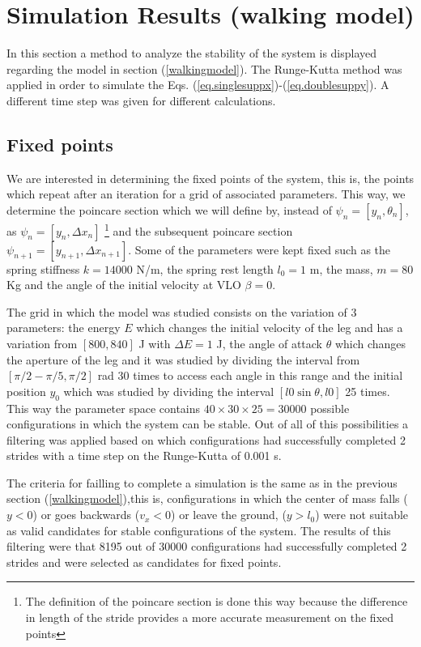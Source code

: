 \section{Simulation Results (walking model)}\label{simulation}
In this section a method to analyze the stability of the system is displayed regarding the model in section (\ref{walkingmodel}). The Runge-Kutta method \cite{runge} was applied in order to simulate the Eqs. (\ref{eq.singlesuppx})-(\ref{eq.doublesuppy}). A different time step was given for different calculations.
\subsection{Fixed points}\label{pontosfixos}
We are interested in determining the fixed points of the system, this is, the points which repeat after an iteration for a grid of associated parameters. This way, we determine the poincare section which we will define by, instead of $\psi_n=[y_n,\theta_n]$, as  $\psi_n=[y_n,\Delta x_n]$ \footnote{The definition of the poincare section is done this way because the difference in length of the stride provides a more accurate measurement on  the fixed points} and the subsequent poincare section $\psi_{n+1}=[y_{n+1},\Delta x_{n+1}]$. Some of the parameters were kept fixed such as the spring stiffness $k=14000$ N/m, the spring rest length $l_0=1$ m, the mass, $m=80$ Kg and the angle of the initial velocity at VLO $\beta=0$.

The grid in which the model was studied consists on the variation of 3 parameters: the energy $E$  which changes the initial velocity of the leg and has a variation from $[800,840]$ J with $\Delta E = 1$ J, the angle of attack $\theta$ which changes the aperture of the leg and it was studied by dividing the interval from $[\pi/2-\pi/5,\pi/2]$ rad 30 times to access each angle in this range and the initial position $y_0$ which was studied by dividing the interval $[l0 \sin{\theta}, l0]$ 25 times. This way the parameter space contains $40 \times 30 \times 25 = 30000$ possible configurations in which the system can be stable. Out of all of this possibilities a filtering was applied based on which configurations had successfully completed 2 strides with a time step on the Runge-Kutta of 0.001 s.

The criteria for failling to complete a simulation is the same as in the previous section (\ref{walkingmodel}),this is, configurations in which the center of mass falls ($y<0$) or goes backwards ($v_x<0$) or leave the ground, ($y>l_0$) were not suitable as valid candidates for stable configurations of the system. The results of this filtering were that 8195 out of 30000 configurations had successfully completed 2 strides and were selected as candidates for fixed points.

